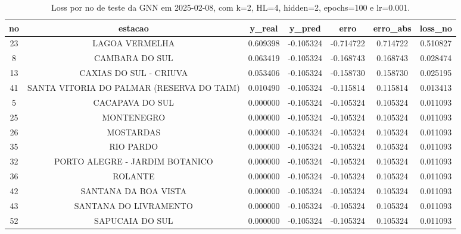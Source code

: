 \begin{table}[h]
\centering
\caption{Loss por no de teste da GNN em 2025-02-08, com k=2, HL=4, hidden=2, epochs=100 e lr=0.001.}
\label{tab:gnn_loss_k2_hl4_h2_e100_d20250208}
\begin{tabular}{ccccccc}
\toprule
no & estacao & y\_real & y\_pred & erro & erro\_abs & loss\_no \\
\midrule
23 & LAGOA VERMELHA & 0.609398 & -0.105324 & -0.714722 & 0.714722 & 0.510827 \\
8 & CAMBARA DO SUL & 0.063419 & -0.105324 & -0.168743 & 0.168743 & 0.028474 \\
13 & CAXIAS DO SUL - CRIUVA & 0.053406 & -0.105324 & -0.158730 & 0.158730 & 0.025195 \\
41 & SANTA VITORIA DO PALMAR (RESERVA DO TAIM) & 0.010490 & -0.105324 & -0.115814 & 0.115814 & 0.013413 \\
5 & CACAPAVA DO SUL & 0.000000 & -0.105324 & -0.105324 & 0.105324 & 0.011093 \\
25 & MONTENEGRO & 0.000000 & -0.105324 & -0.105324 & 0.105324 & 0.011093 \\
26 & MOSTARDAS & 0.000000 & -0.105324 & -0.105324 & 0.105324 & 0.011093 \\
35 & RIO PARDO & 0.000000 & -0.105324 & -0.105324 & 0.105324 & 0.011093 \\
32 & PORTO ALEGRE - JARDIM BOTANICO & 0.000000 & -0.105324 & -0.105324 & 0.105324 & 0.011093 \\
36 & ROLANTE & 0.000000 & -0.105324 & -0.105324 & 0.105324 & 0.011093 \\
42 & SANTANA DA BOA VISTA & 0.000000 & -0.105324 & -0.105324 & 0.105324 & 0.011093 \\
43 & SANTANA DO LIVRAMENTO & 0.000000 & -0.105324 & -0.105324 & 0.105324 & 0.011093 \\
52 & SAPUCAIA DO SUL & 0.000000 & -0.105324 & -0.105324 & 0.105324 & 0.011093 \\
\bottomrule
\end{tabular}
\end{table}
